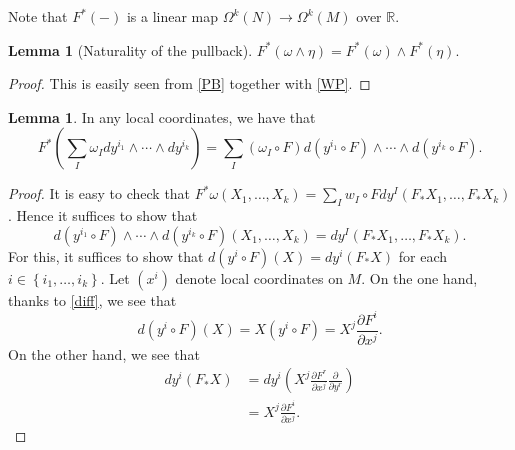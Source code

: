 \documentclass[10pt,letterpaper,cm]{nupset}
\theoremstyle{definition}
\theoremstyle{theorem}
\newtheorem{lemma}[definition]{Lemma}
\theoremstyle{remark}
\newcommand{\R}{\mathbb R}
\newcommand{\1}{\mathbf{1}}
\newcommand{\0}{\vec 0}
\begin{document}
Note that  $F^{\ast}(-)$ is a linear map $\Omega^k(N) \to \Omega^k(M)$ over $\R$. 


\begin{lemma}[Naturality of the pullback]
$F^{\ast}\left(\omega \wedge \eta\right) = F^{\ast}\left(\omega\right) \wedge F^{\ast}\left(\eta\right).$
\end{lemma}
\begin{proof}
This is easily seen from \cref{PB} together with \cref{WP}.
\end{proof}

\begin{lemma}\label{natpull}
In any local coordinates, we have that $$F^{\ast}\left(\sum_I \omega_I dy^{i_1} \wedge \cdots \wedge dy^{i_k}\right) = \sum_I \left(\omega_I \circ F\right)d\left(y^{i_1} \circ F\right) \wedge \cdots \wedge d\left(y^{i_k} \circ F\right).$$
\end{lemma}
\begin{proof}
It is easy to check that $F^{\ast}{\omega}\left(X_1, \ldots, X_k\right) = \sum_Iw_I\circ Fdy^I\left(F_{\ast}{X_1}, \ldots, F_{\ast}{X_k}\right)$. Hence it suffices to show that 
\[
d\left(y^{i_1} \circ F\right) \wedge \cdots \wedge d\left(y^{i_k} \circ F\right)\left(X_1, \ldots, X_k\right) = dy^I\left(F_{\ast}{X_1}, \ldots, F_{\ast}{X_k}\right).
\] For this, it suffices to show that $d\left(y^i \circ F\right)(X) = dy^i\left(F_{\ast}{X}\right)$ for each $i \in \left\{ i_1, \ldots, i_k\right\}$. Let $\left(x^i\right)$ denote local coordinates on $M$. On the one hand, thanks to \cref{diff}, we see that
\[
d\left(y^i \circ F\right)(X)  = X\left(y^i \circ F\right)
= X^j\frac{\partial{F^i}}{\partial{x^j}}
. \]
On the other hand, we see that
\begin{align*}
dy^i\left(F_{\ast}{X}\right) & = dy^i\left(X^j\frac{\partial{F^r}}{\partial{x^j}}\frac{\partial}{\partial{y^r}}    \right)
\\ & = X^j\frac{\partial{F^i}}{\partial{x^j}}
.\end{align*}
\end{proof}
\end{document}
